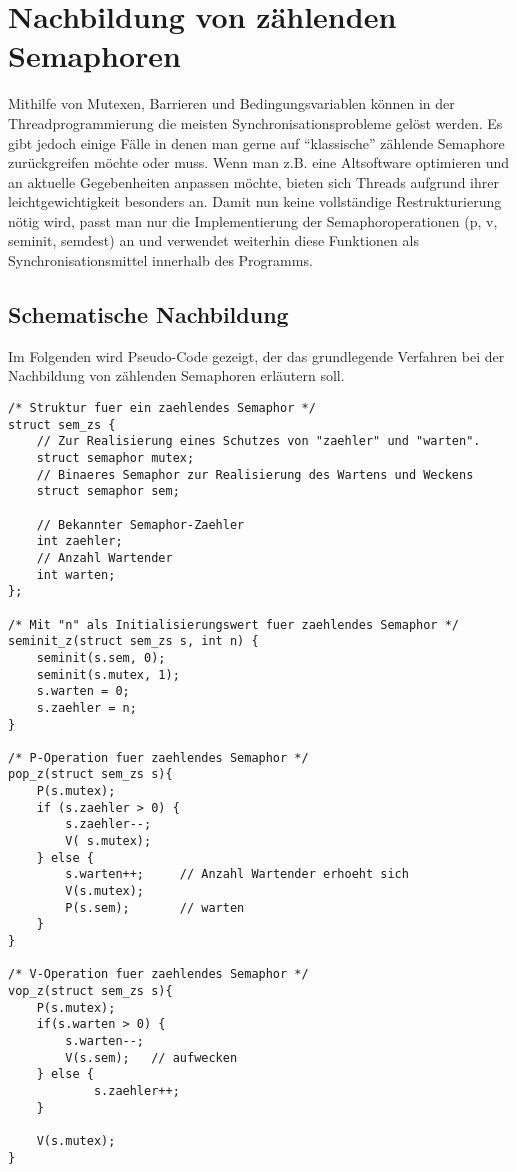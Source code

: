 \documentclass[11pt,a4paper]{article}
\begin{document}
\section{Nachbildung von zählenden Semaphoren}
Mithilfe von Mutexen, Barrieren und Bedingungsvariablen können in der Threadprogrammierung die meisten Synchronisationsprobleme
gelöst werden. Es gibt jedoch einige Fälle in denen man gerne auf ``klassische'' zählende Semaphore zurückgreifen möchte oder muss.
Wenn man z.B. eine Altsoftware optimieren und an aktuelle Gegebenheiten anpassen möchte, bieten sich Threads aufgrund ihrer 
leichtgewichtigkeit besonders an. Damit nun keine vollständige Restrukturierung nötig wird, passt man nur die Implementierung
der Semaphoroperationen (p, v, seminit, semdest) an und verwendet weiterhin diese Funktionen als Synchronisationsmittel innerhalb
des Programms.

\subsection{Schematische Nachbildung}
Im Folgenden wird Pseudo-Code gezeigt, der das grundlegende Verfahren bei der
Nachbildung von zählenden Semaphoren erläutern soll.

\begin{lstlisting}
/* Struktur fuer ein zaehlendes Semaphor */
struct sem_zs {
	// Zur Realisierung eines Schutzes von "zaehler" und "warten".
   	struct semaphor mutex;
	// Binaeres Semaphor zur Realisierung des Wartens und Weckens
   	struct semaphor sem; 
   	
	// Bekannter Semaphor-Zaehler
	int zaehler;
	// Anzahl Wartender
   	int warten;	
};

/* Mit "n" als Initialisierungswert fuer zaehlendes Semaphor */
seminit_z(struct sem_zs s, int n) {   
   	seminit(s.sem, 0);
   	seminit(s.mutex, 1);
   	s.warten = 0;
   	s.zaehler = n;
}

/* P-Operation fuer zaehlendes Semaphor */
pop_z(struct sem_zs s){		
   	P(s.mutex);
   	if (s.zaehler > 0) {
      	s.zaehler--; 
		V( s.mutex);
   	} else {
      	s.warten++; 	// Anzahl Wartender erhoeht sich
      	V(s.mutex);
      	P(s.sem);		// warten
   	}
}

/* V-Operation fuer zaehlendes Semaphor */
vop_z(struct sem_zs s){
   	P(s.mutex);
   	if(s.warten > 0) {
      	s.warten--; 
      	V(s.sem);	// aufwecken
  	} else {
     		s.zaehler++;
   	}

   	V(s.mutex);
}
\end{lstlisting}
\end{document}
